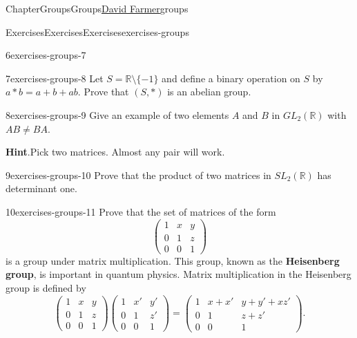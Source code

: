 \documentclass[oneside,10pt,]{book}
\newcommand{\blocktitlefont}{\relax}
\newcommand{\terminology}[1]{\textbf{#1}}
\numberwithin{equation}{section}
\begin{document}
\begin{chapterptx}{Chapter}{Groups}{}{Groups}{\hyperlink{dfarmer}{David Farmer}}{}{groups}
\begin{exercises-section}{Exercises}{Exercises}{}{Exercises}{}{}{exercises-groups}
\begin{divisionexercise}{6}{}{}{exercises-groups-7}
%
\end{divisionexercise}%
\begin{divisionexercise}{7}{}{}{exercises-groups-8}%
Let \(S = {\mathbb R} \setminus \{ -1 \}\) and define a binary operation on \(S\) by \(a \ast b = a + b + ab\). Prove that \((S, \ast)\) is an abelian group.%
\end{divisionexercise}%
\begin{divisionexercise}{8}{}{}{exercises-groups-9}%
Give an example of two elements \(A\) and \(B\) in \(GL_2({\mathbb R})\) with \(AB \neq BA\).%
\par\smallskip%
\noindent\textbf{\blocktitlefont Hint}.\hypertarget{exercises-groups-9-2}{}\quad{}Pick two matrices. Almost any pair will work.%
\end{divisionexercise}%
\begin{divisionexercise}{9}{}{}{exercises-groups-10}%
Prove that the product of two matrices in \(SL_2({\mathbb R})\) has determinant one.%
\end{divisionexercise}%
\begin{divisionexercise}{10}{}{}{exercises-groups-11}%
Prove that the set of matrices of the form%
\begin{equation*}
\begin{pmatrix}
1 & x & y \\
0 & 1 & z \\
0 & 0 & 1
\end{pmatrix}
\end{equation*}
is a group under matrix multiplication.  This group, known as the \terminology{Heisenberg group}, is important in quantum physics. Matrix multiplication in the Heisenberg group is defined by%
\begin{equation*}
\begin{pmatrix}
1 & x & y \\
0 & 1 & z \\
0 & 0 & 1
\end{pmatrix}
\begin{pmatrix}
1 & x' & y' \\
0 & 1 & z' \\
0 & 0 & 1
\end{pmatrix}
=
\begin{pmatrix}
1 & x+x' & y+y'+xz' \\
0 & 1 & z+z' \\
0 & 0 & 1
\end{pmatrix}.
\end{equation*}
%
\end{divisionexercise}%

\end{exercises-section}
\end{chapterptx}
\end{document}
